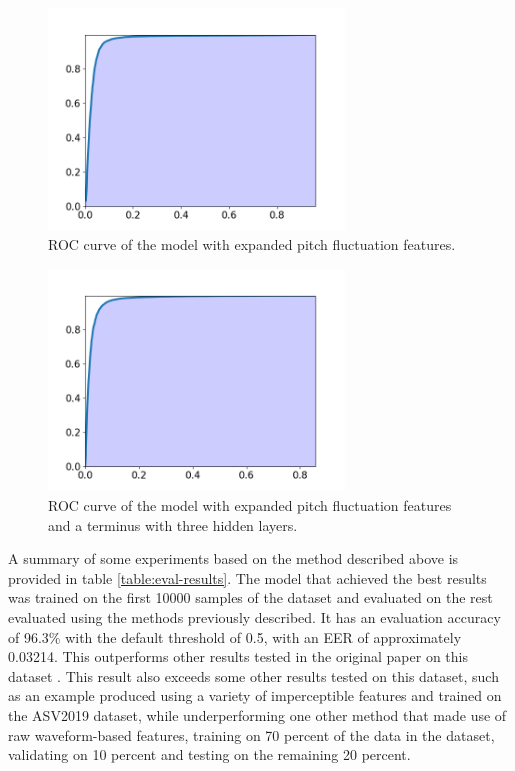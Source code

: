 \documentclass{article}
\begin{document}
		\begin{figure}[htbp]
			\centering
			\includegraphics[width=0.7\textwidth]{images/roc_mpf.png}
			\caption{ROC curve of the model with expanded pitch fluctuation features.}
			\label{fig:roc_mpf}
		\end{figure}
		\begin{figure}[htbp]
			\centering
			\includegraphics[width=0.7\textwidth]{images/roc_mpf_cterm.png}
			\caption{ROC curve of the model with expanded pitch fluctuation features and a terminus with three hidden layers.}
			\label{fig:roc_mpf_cterm}
		\end{figure}
		\sloppy
		A summary of some experiments based on the method described above is provided in table
		\ref{table:eval-results}. The model that achieved the best results was trained on the
		first 10000 samples of the dataset and evaluated on the rest evaluated using the methods
		previously described. It has an evaluation accuracy of 96.3\% with the default threshold of
		0.5, with an EER of approximately 0.03214. This outperforms other results tested in the
		original paper on this dataset \cite{muller_does_2022}. This result also exceeds some
		other results tested on this dataset, such as an example \cite{yang_robust_2024} produced
		using a variety of imperceptible features and trained on the ASV2019 dataset, while
		underperforming one other method \cite{ranjan_statnet_2022} that made use of raw
		waveform-based features, training on 70 percent of the data in the dataset, validating on
		10 percent and testing on the remaining 20 percent.
\end{document}
